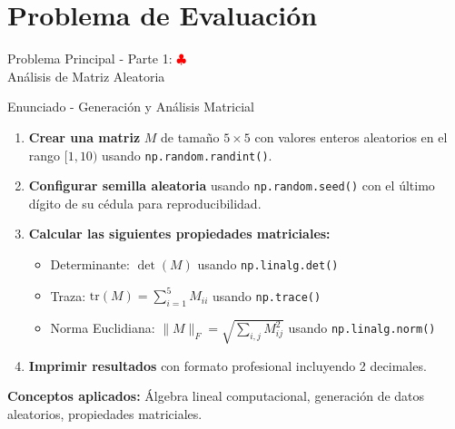 \documentclass[10pt]{beamer}
\begin{document}
\section{Problema de Evaluación}

\begin{frame}{Problema Principal - Parte 1: \hfill \textcolor{red}{$\clubsuit$} \\ Análisis de Matriz Aleatoria}
  \begin{block}{Enunciado - Generación y Análisis Matricial}
    \begin{enumerate}
      \item \textbf{Crear una matriz} $M$ de tamaño $5 \times 5$ con valores enteros aleatorios en el rango $[1, 10)$ usando \texttt{np.random.randint()}.
      \item \textbf{Configurar semilla aleatoria} usando \texttt{np.random.seed()} con el último dígito de su cédula para reproducibilidad.
      \item \textbf{Calcular las siguientes propiedades matriciales:}
        \begin{itemize}
          \item Determinante: $\det(M)$ usando \texttt{np.linalg.det()}
          \item Traza: $\text{tr}(M) = \sum_{i=1}^{5} M_{ii}$ usando \texttt{np.trace()}
          \item Norma Euclidiana: $\|M\|_F = \sqrt{\sum_{i,j} M_{ij}^2}$ usando \texttt{np.linalg.norm()}
        \end{itemize}
      \item \textbf{Imprimir resultados} con formato profesional incluyendo 2 decimales.
    \end{enumerate}
  \end{block}
  
  \textbf{Conceptos aplicados:} Álgebra lineal computacional, generación de datos aleatorios, propiedades matriciales.
\end{frame}
\end{document}
